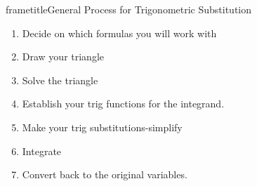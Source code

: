 \begin{frame}frametitle{General Process for Trigonometric Substitution}

\begin{enumerate}
\item Decide on which formulas you will work with
\item Draw your triangle
\item Solve the triangle
 \item Establish your trig functions for the integrand.
\item Make your trig substitutions-simplify
\item Integrate
\item Convert back to the original variables.
\end{enumerate}
\end{frame}
